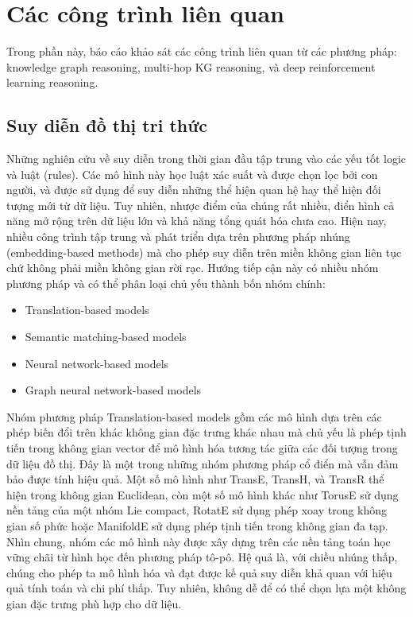 \section{Các công trình liên quan}
Trong phần này, báo cáo khảo sát các công trình liên quan từ các phương pháp: knowledge graph reasoning, multi-hop KG reasoning, và deep reinforcement learning reasoning.

\subsection{Suy diễn đồ thị tri thức}
Những nghiên cứu về suy diễn trong thời gian đầu tập trung vào các yếu tốt logic và luật (rules). 
Các mô hình này học luật xác suất và được chọn lọc bởi con người, và được sử dụng để suy diễn những thể hiện quan hệ hay thể hiện đối tượng mới từ dữ liệu. 
Tuy nhiên, nhược điểm của chúng rất nhiều, điển hình cả năng mở rộng trên dữ liệu lớn và khả năng tổng quát hóa chưa cao. Hiện nay, nhiều công trình tập trung và phát triển
dựa trên phương pháp nhúng (embedding-based methods) mà cho phép suy diễn trên miền không gian liên tục chứ không phải miền không gian rời rạc. Hướng tiếp cận này
có nhiều nhóm phương pháp và có thể phân loại chủ yếu thành bốn nhóm chính:
\begin{itemize}
    \item Translation-based models
    \item Semantic matching-based models
    \item Neural network-based models
    \item Graph neural network-based models
\end{itemize}

Nhóm phương pháp Translation-based models gồm các mô hình dựa trên các phép biến đổi trên khác không gian đặc trưng khác nhau mà chủ yếu là phép tịnh tiến trong không gian vector
để mô hình hóa tương tác giữa các đối tượng trong dữ liệu đồ thị. Đây là một trong những nhóm phương pháp cổ điển mà vẫn đảm bảo được tính hiệu quả. 
Một số mô hình như TransE\cite{bordes2013translating}, TransH\cite{wang2014knowledge}, và TransR\cite{lin2015learning} thể hiện trong không gian Euclidean, còn một số mô hình khác như TorusE\cite{ebisu2018toruse} sử dụng 
nền tảng của một nhóm Lie compact, RotatE\cite{sun2019rotate} sử dụng phép xoay trong không gian số phức hoặc ManifoldE\cite{xiao2015one} sử dụng phép tịnh tiến trong không gian đa tạp.
Nhìn chung, nhóm các mô hình này được xây dựng trên các nền tảng toán học vững chãi từ hình học đến phương pháp tô-pô. Hệ quả là, với
chiều nhúng thấp, chúng cho phép ta mô hình hóa và đạt được kế quả suy diễn khả quan với hiệu quả tính toán và chi phí thấp.
Tuy nhiên, không dễ để có thể chọn lựa một không gian đặc trưng phù hợp cho dữ liệu.

